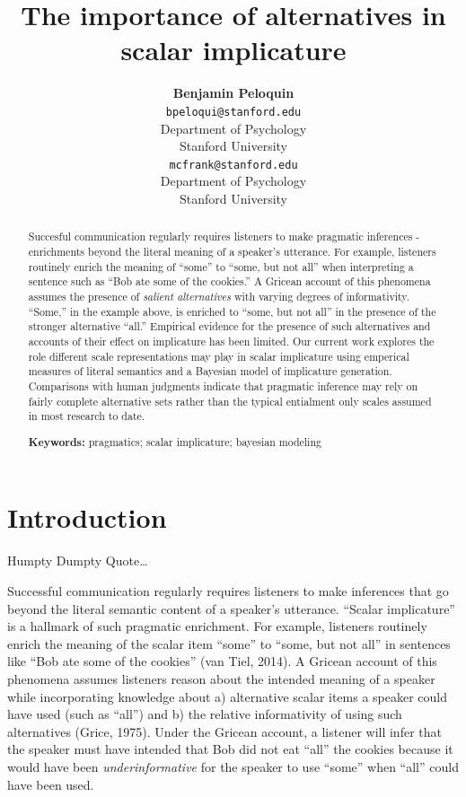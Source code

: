 \documentclass[10pt, letterpaper]{article}
\title{The importance of alternatives in scalar implicature}
\author{{\large \bf Benjamin Peloquin} \\ \texttt{bpeloqui@stanford.edu} \\ Department of Psychology \\ Stanford University \And {\large \bf Michael C. Frank} \\ \texttt{mcfrank@stanford.edu} \\ Department of Psychology \\ Stanford University}
\begin{document}
\maketitle

\begin{abstract}
Succesful communication regularly requires listeners to make pragmatic
inferences - enrichments beyond the literal meaning of a speaker's
utterance. For example, listeners routinely enrich the meaning of
``some'' to ``some, but not all'' when interpreting a sentence such as
``Bob ate some of the cookies.'' A Gricean account of this phenomena
assumes the presence of \emph{salient alternatives} with varying degrees
of informativity. ``Some,'' in the example above, is enriched to ``some,
but not all'' in the presence of the stronger alternative ``all.''
Empirical evidence for the presence of such alternatives and accounts of
their effect on implicature has been limited. Our current work explores
the role different scale representations may play in scalar implicature
using emperical measures of literal semantics and a Bayesian model of
implicature generation. Comparisons with human judgments indicate that
pragmatic inference may rely on fairly complete alternative sets rather
than the typical entialment only scales assumed in most research to
date.

\textbf{Keywords:}
pragmatics; scalar implicature; bayesian modeling
\end{abstract}

\section{Introduction}\label{introduction}

Humpty Dumpty Quote\ldots{}

Successful communication regularly requires listeners to make inferences
that go beyond the literal semantic content of a speaker's utterance.
``Scalar implicature'' is a hallmark of such pragmatic enrichment. For
example, listeners routinely enrich the meaning of the scalar item
``some'' to ``some, but not all'' in sentences like ``Bob ate some of
the cookies'' (van Tiel, 2014). A Gricean account of this phenomena
assumes listeners reason about the intended meaning of a speaker while
incorporating knowledge about a) alternative scalar items a speaker
could have used (such as ``all'') and b) the relative informativity of
using such alternatives (Grice, 1975). Under the Gricean account, a
listener will infer that the speaker must have intended that Bob did not
eat ``all'' the cookies because it would have been
\emph{underinformative} for the speaker to use ``some'' when ``all''
could have been used.
\end{document}
